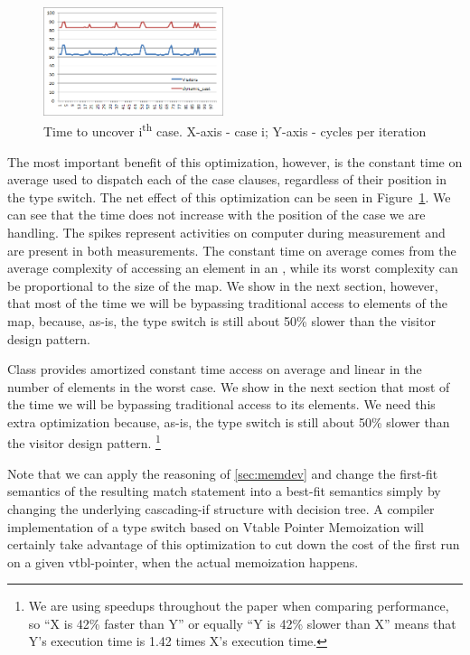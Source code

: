 \begin{figure}[htbp]
  \centering
    \includegraphics[width=0.47\textwidth]{DCast-vs-Visitors3.png}
  \caption{Time to uncover i\textsuperscript{th} case. X-axis - case i; Y-axis - cycles per iteration}
  \label{fig:DCastVis3}
\end{figure}

The most important benefit of this optimization, however, is the constant time 
on average used to dispatch each of the case clauses, regardless of their 
position in the type switch. The net effect of this optimization can be seen in Figure~\ref{fig:DCastVis3}. 
We can see that the time does not increase with the position of the case we are 
handling. The spikes represent activities on computer during measurement and are 
present in both measurements. 
The constant time on average comes from the average complexity 
of accessing an element in an , while its worst complexity can 
be proportional to the size of the map. We show in the next section, however, 
that most of the time we will be bypassing traditional access to elements of the 
map, because, as-is, the type switch is still about 50\% slower than the visitor 
design pattern.

\noindent
Class  provides amortized constant time access on 
average and linear in the number of elements in the worst case. We show in the 
next section that most of the time we will be bypassing traditional access to 
its elements. We need this extra optimization because, as-is, the type switch is 
still about 50\% slower than the visitor design pattern.
\footnote{We are using 
speedups throughout the paper when comparing performance, so ``X is 42\% faster 
than Y'' or equally ``Y is 42\% slower than X'' means that Y's execution time is 
1.42 times X's execution time.}

Note that we can apply the reasoning of \textsection\ref{sec:memdev} and change 
the first-fit semantics of the resulting match statement into a best-fit 
semantics simply by changing the underlying cascading-if structure with decision 
tree. A compiler implementation of a type switch based on Vtable Pointer 
Memoization will certainly take advantage of this optimization to cut down the 
cost of the first run on a given vtbl-pointer, when the actual memoization happens.

